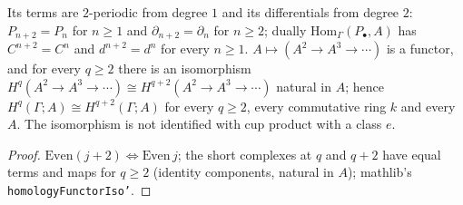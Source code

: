 \begin{theorem}\label{thm:mp-tree-periodic}
  \leanok
  Its terms are $2$-periodic from degree $1$ and its differentials from degree $2$: $P_{n+2}=P_n$ for $n\ge1$ and
  $\partial_{n+2}=\partial_n$ for $n\ge2$; dually $\mathrm{Hom}_\Gamma(P_\bullet,A)$ has $C^{n+2}=C^n$ and $d^{n+2}=d^n$ for every
  $n\ge1$.  $A\mapsto(A^2\to A^3\to\cdots)$ is a functor, and for every $q\ge2$ there is an isomorphism
  $H^q(A^2\to A^3\to\cdots)\cong H^{q+2}(A^2\to A^3\to\cdots)$ natural in $A$; hence $H^q(\Gamma;A)\cong H^{q+2}(\Gamma;A)$ for every
  $q\ge2$, every commutative ring $k$ and every $A$.  The isomorphism is not identified with cup product with a class $e$.
\end{theorem}
\begin{proof}
  \leanok
  $\mathrm{Even}(j+2)\Leftrightarrow\mathrm{Even}\,j$; the short complexes at $q$ and $q+2$ have equal terms and maps for $q\ge2$
  (identity components, natural in $A$); mathlib's \texttt{homologyFunctorIso'}.
\end{proof}

